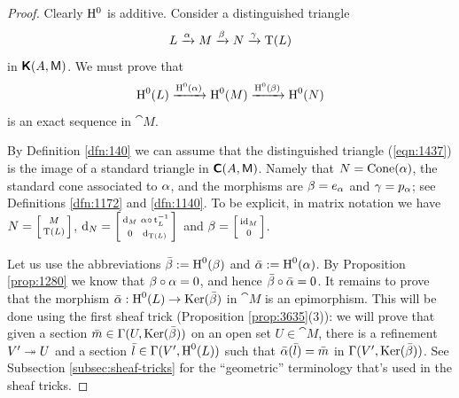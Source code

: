 \begin{proof}
Clearly $\mathrm{H}^0$ is additive. Consider a distinguished triangle 
\begin{equation} \label{eqn:1437}
L \xrightarrow{\alpha} M \xrightarrow{\beta} N \xrightarrow{\gamma} \operatorname{T}(L)
\end{equation}
in $\boldsymbol{\mathsf{K}}(A, \operatorname{\mathsf{M}})$. We must prove that 
\[ \operatorname{H}^{0}(L) \xrightarrow{\operatorname{H}^0(\alpha)} \operatorname{H}^{0}(M)
\xrightarrow{\operatorname{H}^0(\beta)} \operatorname{H}^{0}(N) \]
is an exact sequence in $\cat{M}$. 

By Definition \ref{dfn:140} we can assume that the distinguished triangle 
(\ref{eqn:1437}) is the image of a standard triangle in  
$\boldsymbol{\mathsf{C}}(A, \operatorname{\mathsf{M}})$. Namely that $N = \operatorname{Cone}(\alpha)$, the standard 
cone associated to $\alpha$, and the morphisms are 
$\beta = e_{\alpha}$ and $\gamma = p_{\alpha}$; see Definitions  \ref{dfn:1172} and 
\ref{dfn:1140}. To be explicit, in matrix notation we have 
$N = \left[ \begin{smallmatrix} M \\[0.2em] \operatorname{T}(L) \end{smallmatrix} \right]$, 
$\mathrm{d}_N = \left[ \begin{smallmatrix} \mathrm{d}_M & \alpha \circ \, \operatorname{t}_L^{-1} 
\\[0.2em] 0 & \mathrm{d}_{\operatorname{T}(L)} \end{smallmatrix} \right]$ 
and 
$\beta = \left[ \begin{smallmatrix} \operatorname{id}_M \\[0.2em] 0 \end{smallmatrix} \right]$.

Let us use the abbreviations $\bar{\beta} := \operatorname{H}^0(\beta)$ and
$\bar{\alpha} := \operatorname{H}^0(\alpha)$. 
By Proposition \ref{prop:1280} we know that $\beta \circ \alpha = 0$, and hence 
$\bar{\beta} \circ \bar{\alpha} = 0$. 
It remains to prove that the morphism 
$\bar{\alpha}  : \operatorname{H}^0(L) \to \operatorname{Ker}(\bar{\beta})$
in $\cat{M}$ is an epimorphism. 
This will be done using the first sheaf trick (Proposition \ref{prop:3635}(3)):
we will prove that given a section 
$\bar{m} \in \Gamma(U, \operatorname{Ker}(\bar{\beta}))$
on an open set $U \in \cat{M}$, there is a refinement
$V' \twoheadrightarrow U$ and a section 
$\bar{l} \in \Gamma(V', \operatorname{H}^0(L))$
such that $\bar{\alpha}(\bar{l}) = \bar{m}$
in $\Gamma(V', \operatorname{Ker}(\bar{\beta}))$. 
See Subsection \ref{subsec:sheaf-tricks} for the ``geometric'' terminology 
that's used in the sheaf tricks. 


\end{proof}
